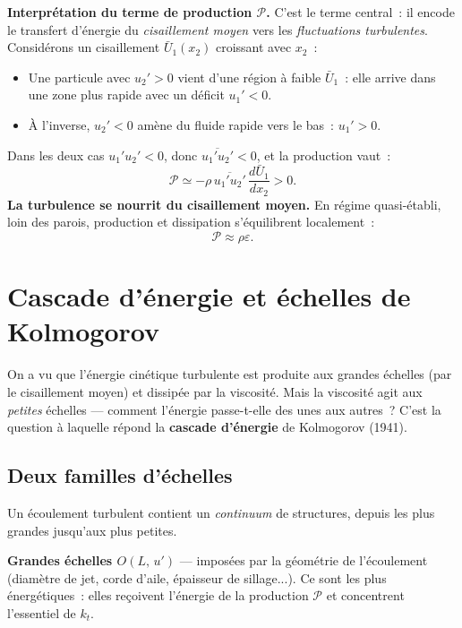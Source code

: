 \documentclass[11pt,a4paper]{report}
\begin{document}
\noindent\textbf{Interpr\'etation du terme de production $\mathcal{P}$.}
C'est le terme central~: il encode le transfert d'\'energie du \emph{cisaillement moyen}
vers les \emph{fluctuations turbulentes}. Consid\'erons un cisaillement
$\bar{U}_1(x_2)$ croissant avec $x_2$~:
\begin{itemize}
  \item Une particule avec $u_2' > 0$ vient d'une r\'egion \`a faible $\bar{U}_1$~: elle
        arrive dans une zone plus rapide avec un d\'eficit $u_1' < 0$.
  \item \`A l'inverse, $u_2' < 0$ am\`ene du fluide rapide vers le bas~: $u_1' > 0$.
\end{itemize}
Dans les deux cas $u_1'u_2' < 0$, donc $\overline{u_1'u_2'} < 0$, et la production vaut~:
\[
  \mathcal{P} \simeq -\rho\,\overline{u_1'u_2'}\,\frac{d\bar{U}_1}{dx_2} > 0.
\]
\textbf{La turbulence se nourrit du cisaillement moyen.} En r\'egime quasi-\'etabli, loin des
parois, production et dissipation s'\'equilibrent localement~:
\[
  \mathcal{P} \approx \rho\varepsilon.
\]

\section{Cascade d'\'energie et \'echelles de Kolmogorov}

On a vu que l'\'energie cin\'etique turbulente est produite aux grandes \'echelles (par le
cisaillement moyen) et dissip\'ee par la viscosit\'e. Mais la viscosit\'e agit aux
\emph{petites} \'echelles --- comment l'\'energie passe-t-elle des unes aux autres~?
C'est la question \`a laquelle r\'epond la \textbf{cascade d'\'energie} de Kolmogorov (1941).

\subsection{Deux familles d'\'echelles}

Un \'ecoulement turbulent contient un \emph{continuum} de structures, depuis les plus grandes
jusqu'aux plus petites.

\medskip
\noindent\textbf{Grandes \'echelles $O(L,\,u')$} --- impos\'ees par la g\'eom\'etrie de
l'\'ecoulement (diam\`etre de jet, corde d'aile, \'epaisseur de sillage...). Ce sont les plus
\'energ\'etiques~: elles re\c coivent l'\'energie de la production $\mathcal{P}$ et concentrent
l'essentiel de $k_t$.
\end{document}
